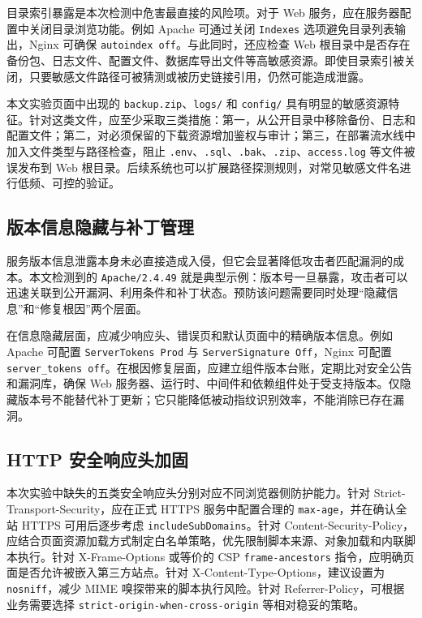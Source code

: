 \documentclass[12pt,a4paper,fontset=none]{ctexart}
\begin{document}
目录索引暴露是本次检测中危害最直接的风险项。对于 Web 服务，应在服务器配置中关闭目录浏览功能。例如 Apache 可通过关闭 \texttt{Indexes} 选项避免目录列表输出，Nginx 可确保 \texttt{autoindex off}。与此同时，还应检查 Web 根目录中是否存在备份包、日志文件、配置文件、数据库导出文件等高敏感资源。即使目录索引被关闭，只要敏感文件路径可被猜测或被历史链接引用，仍然可能造成泄露。

本文实验页面中出现的 \texttt{backup.zip}、\texttt{logs/} 和 \texttt{config/} 具有明显的敏感资源特征。针对这类文件，应至少采取三类措施：第一，从公开目录中移除备份、日志和配置文件；第二，对必须保留的下载资源增加鉴权与审计；第三，在部署流水线中加入文件类型与路径检查，阻止 \texttt{.env}、\texttt{.sql}、\texttt{.bak}、\texttt{.zip}、\texttt{access.log} 等文件被误发布到 Web 根目录。后续系统也可以扩展路径探测规则，对常见敏感文件名进行低频、可控的验证。

\subsection{版本信息隐藏与补丁管理}

服务版本信息泄露本身未必直接造成入侵，但它会显著降低攻击者匹配漏洞的成本。本文检测到的 \texttt{Apache/2.4.49} 就是典型示例：版本号一旦暴露，攻击者可以迅速关联到公开漏洞、利用条件和补丁状态。预防该问题需要同时处理“隐藏信息”和“修复根因”两个层面。

在信息隐藏层面，应减少响应头、错误页和默认页面中的精确版本信息。例如 Apache 可配置 \texttt{ServerTokens Prod} 与 \texttt{ServerSignature Off}，Nginx 可配置 \texttt{server\_tokens off}。在根因修复层面，应建立组件版本台账，定期比对安全公告和漏洞库，确保 Web 服务器、运行时、中间件和依赖组件处于受支持版本。仅隐藏版本号不能替代补丁更新；它只能降低被动指纹识别效率，不能消除已存在漏洞。

\subsection{HTTP 安全响应头加固}

本次实验中缺失的五类安全响应头分别对应不同浏览器侧防护能力。针对 Strict-Transport-Security，应在正式 HTTPS 服务中配置合理的 \texttt{max-age}，并在确认全站 HTTPS 可用后逐步考虑 \texttt{includeSubDomains}。针对 Content-Security-Policy，应结合页面资源加载方式制定白名单策略，优先限制脚本来源、对象加载和内联脚本执行。针对 X-Frame-Options 或等价的 CSP \texttt{frame-ancestors} 指令，应明确页面是否允许被嵌入第三方站点。针对 X-Content-Type-Options，建议设置为 \texttt{nosniff}，减少 MIME 嗅探带来的脚本执行风险。针对 Referrer-Policy，可根据业务需要选择 \texttt{strict-origin-when-cross-origin} 等相对稳妥的策略。
\end{document}
